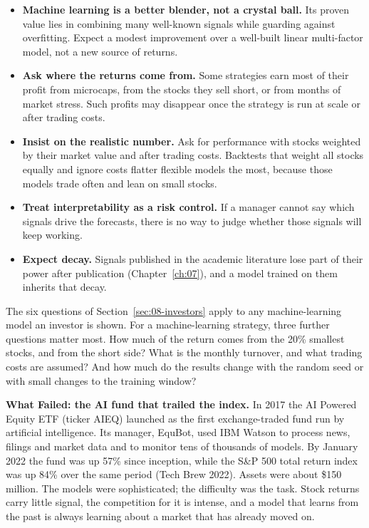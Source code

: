 \begin{itemize}
  \item \textbf{Machine learning is a better blender, not a crystal ball.} Its proven value lies in combining many well-known signals while guarding against overfitting. Expect a modest improvement over a well-built linear multi-factor model, not a new source of returns.
  \item \textbf{Ask where the returns come from.} Some strategies earn most of their profit from microcaps, from the stocks they sell short, or from months of market stress. Such profits may disappear once the strategy is run at scale or after trading costs.
  \item \textbf{Insist on the realistic number.} Ask for performance with stocks weighted by their market value and after trading costs. Backtests that weight all stocks equally and ignore costs flatter flexible models the most, because those models trade often and lean on small stocks.
  \item \textbf{Treat interpretability as a risk control.} If a manager cannot say which signals drive the forecasts, there is no way to judge whether those signals will keep working.
  \item \textbf{Expect decay.} Signals published in the academic literature lose part of their power after publication (Chapter~\ref{ch:07}), and a model trained on them inherits that decay.
\end{itemize}
The six questions of Section~\ref{sec:08-investors} apply to any machine-learning model an investor is shown. For a machine-learning strategy, three further questions matter most. How much of the return comes from the 20\% smallest stocks, and from the short side? What is the monthly turnover, and what trading costs are assumed? And how much do the results change with the random seed or with small changes to the training window?

\begin{callout}
\textbf{What Failed: the AI fund that trailed the index.} In 2017 the AI Powered Equity ETF (ticker AIEQ) launched as the first exchange-traded fund run by artificial intelligence. Its manager, EquBot, used IBM Watson to process news, filings and market data and to monitor tens of thousands of models. By January 2022 the fund was up 57\% since inception, while the S\&P 500 total return index was up 84\% over the same period (Tech Brew 2022). Assets were about \$150 million. The models were sophisticated; the difficulty was the task. Stock returns carry little signal, the competition for it is intense, and a model that learns from the past is always learning about a market that has already moved on.
\end{callout}

